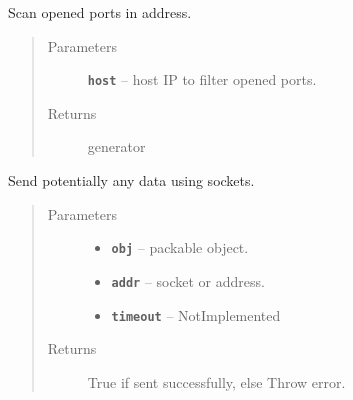 \documentclass[letterpaper,10pt,english]{sphinxmanual}
\begin{document}

\begin{fulllineitems}
\label{RRtoolbox.lib:RRtoolbox.lib.serverServices.scan_ports}
Scan opened ports in address.
\begin{quote}\begin{description}
\item[{Parameters}] \leavevmode
\textbf{\texttt{host}} -- host IP to filter opened ports.

\item[{Returns}] \leavevmode
generator

\end{description}\end{quote}

\end{fulllineitems}


\begin{fulllineitems}
\label{RRtoolbox.lib:RRtoolbox.lib.serverServices.sendPickle}
Send potentially any data using sockets.
\begin{quote}\begin{description}
\item[{Parameters}] \leavevmode\begin{itemize}
\item {} 
\textbf{\texttt{obj}} -- packable object.

\item {} 
\textbf{\texttt{addr}} -- socket or address.

\item {} 
\textbf{\texttt{timeout}} -- NotImplemented

\end{itemize}

\item[{Returns}] \leavevmode
True if sent successfully, else Throw error.

\end{description}\end{quote}

\end{fulllineitems}
\end{document}
